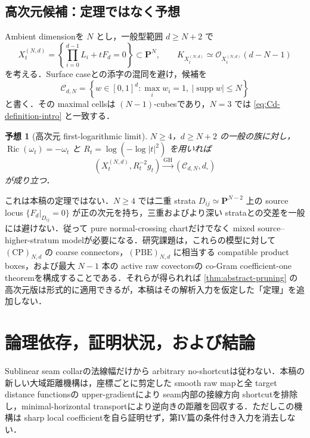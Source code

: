 \documentclass[a4paper,11pt]{ltjsarticle}
\numberwithin{equation}{section}
\theoremstyle{plain}
\newtheorem{conjecture}[conjecture]{予想}
\theoremstyle{definition}
\theoremstyle{remark}
\newcommand{\PP}{\mathbf P}
\newcommand{\supp}{\operatorname{supp}}
\newcommand{\Ric}{\operatorname{Ric}}
\newcommand{\GH}{\mathrm{GH}}
\newcommand{\Cnd}{\mathcal C_{d,N}}
\begin{document}
\subsection{高次元候補：定理ではなく予想}
Ambient dimensionを $N$ とし，一般型範囲 $d\ge N+2$ で
\[
 X_t^{(N,d)}=\left\{\prod_{i=0}^{d-1}L_i+tF_d=0\right\}\subset\PP^N,
 \qquad K_{X_t^{(N,d)}}\simeq\mathcal O_{X_t^{(N,d)}}(d-N-1)
\]
を考える．Surface caseとの添字の混同を避け，候補を
\begin{equation}\label{eq:higher-dimensional-candidate}
 \Cnd=
 \left\{w\in[0,1]^d:\max_iw_i=1,\ |\supp w|\le N\right\}
\end{equation}
と書く．その maximal cellsは $(N-1)$-cubesであり，$N=3$ では \eqref{eq:Cd-definition-intro} と一致する．

\begin{conjecture}[高次元 first-logarithmic limit]\label{conj:higher-dimensional-limit}
$N\ge4$，$d\ge N+2$ の一般の族に対し，$\Ric(\omega_t)=-\omega_t$ と $R_t=\log(-\log|t|^2)$ を用いれば
\[
 (X_t^{(N,d)},R_t^{-2}g_t)\xrightarrow{\GH}(\Cnd,d_\square)
\]
が成り立つ．
\end{conjecture}

これは本稿の定理ではない．$N\ge4$ では二重 strata $D_{ij}\simeq\PP^{N-2}$ 上の source locus
$\{F_d|_{D_{ij}}=0\}$ が正の次元を持ち，三重およびより深い strataとの交差を一般には避けない．従って
pure normal-crossing chartだけでなく mixed source--higher-stratum modelが必要になる．研究課題は，これらの模型に対して
$\mathrm{(CP)}_{N,d}$ の coarse connectors，$\mathrm{(PBE)}_{N,d}$ に相当する compatible product boxes，および最大
$N-1$ 本の active raw covectorsの co-Gram coefficient-one theoremを構成することである．それらが得られれば
\cref{thm:abstract-pruning} の高次元版は形式的に適用できるが，本稿はその解析入力を仮定した「定理」を追加しない．

\section{論理依存，証明状況，および結論}\label{sec:status}

Sublinear seam collarの法線幅だけから arbitrary no-shortcutは従わない．本稿の新しい大域距離機構は，座標ごとに剪定した smooth raw mapと全 target distance functionsの upper-gradientにより seam内部の接線方向 shortcutを排除し，minimal-horizontal transportにより逆向きの距離を回収する．ただしこの機構は sharp local coefficientを自ら証明せず，第IV篇の条件付き入力を消去しない．
\end{document}
